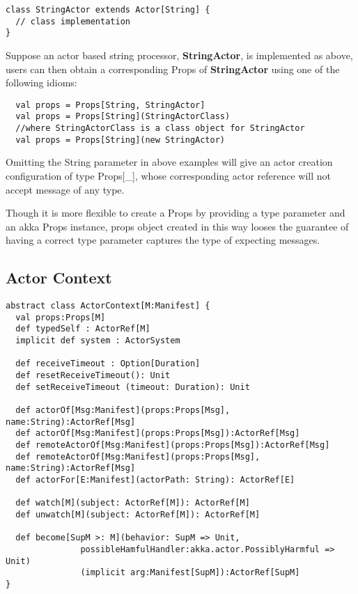 \begin{lstlisting}
class StringActor extends Actor[String] {
  // class implementation
}
\end{lstlisting}

Suppose an actor based string processor, \textbf{StringActor}, is implemented as above, users can then obtain a corresponding Props of \textbf{StringActor} using one of the following idioms:

\begin{lstlisting}
  val props = Props[String, StringActor]
  val props = Props[String](StringActorClass)
  //where StringActorClass is a class object for StringActor
  val props = Props[String](new StringActor)
\end{lstlisting}

Omitting the String parameter in above examples will give an actor creation configuration of type Props[\_], whose corresponding actor reference will not accept message of any type.

Though it is more flexible to create a Props by providing a type parameter and an akka Props instance, props object created in this way looses the guarantee of having a correct type parameter captures the type of expecting messages.

\subsection{Actor Context}
\label{sec_actor_context}
\begin{lstlisting}
abstract class ActorContext[M:Manifest] {
  val props:Props[M]
  def typedSelf : ActorRef[M]
  implicit def system : ActorSystem

  def receiveTimeout : Option[Duration]  
  def resetReceiveTimeout(): Unit
  def setReceiveTimeout (timeout: Duration): Unit
  
  def actorOf[Msg:Manifest](props:Props[Msg], name:String):ActorRef[Msg]  
  def actorOf[Msg:Manifest](props:Props[Msg]):ActorRef[Msg]
  def remoteActorOf[Msg:Manifest](props:Props[Msg]):ActorRef[Msg]  
  def remoteActorOf[Msg:Manifest](props:Props[Msg], name:String):ActorRef[Msg]
  def actorFor[E:Manifest](actorPath: String): ActorRef[E]

  def watch[M](subject: ActorRef[M]): ActorRef[M]  
  def unwatch[M](subject: ActorRef[M]): ActorRef[M]

  def become[SupM >: M](behavior: SupM => Unit,    
               possibleHamfulHandler:akka.actor.PossiblyHarmful => Unit)
               (implicit arg:Manifest[SupM]):ActorRef[SupM]
}
\end{lstlisting}

